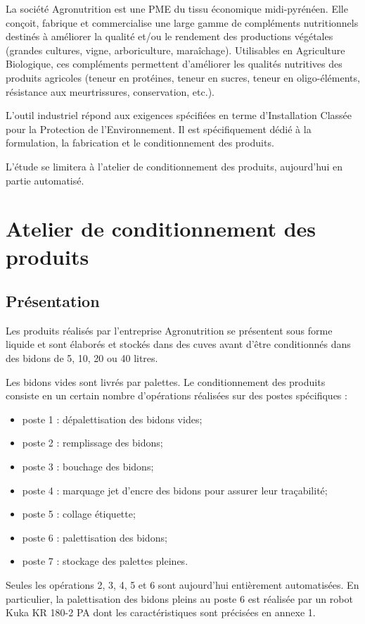 La société Agronutrition est une PME du tissu économique midi-pyrénéen. Elle conçoit, 
fabrique et commercialise une large gamme de compléments nutritionnels destinés à 
améliorer la qualité et/ou le rendement des productions végétales (grandes cultures, vigne, 
arboriculture, maraîchage). Utilisables en Agriculture Biologique, ces compléments 
permettent d'améliorer les qualités nutritives des produits agricoles (teneur en protéines, 
teneur en sucres, teneur en oligo-éléments, résistance aux meurtrissures, conservation, etc.). 

L’outil industriel répond aux exigences spécifiées en terme d’Installation Classée pour la 
Protection de l’Environnement. Il est spécifiquement dédié à la formulation, la fabrication et 
le conditionnement des produits. 

L’étude se limitera à l’atelier de conditionnement des produits, aujourd’hui en partie 
automatisé.

\section{Atelier de conditionnement des produits}

\subsection{Présentation }
Les produits réalisés par l’entreprise Agronutrition se présentent sous forme liquide et sont 
élaborés et stockés dans des cuves avant d’être conditionnés dans des bidons de 5, 10, 20 ou 
40 litres. 

Les bidons vides sont livrés par palettes. Le conditionnement des produits consiste en un 
certain nombre d’opérations réalisées sur des postes spécifiques : 
\begin{itemize}
\item poste 1 : dépalettisation des bidons vides;
\item poste 2 : remplissage des bidons;
\item poste 3 : bouchage des bidons;
\item poste 4 : marquage jet d’encre des bidons pour assurer leur traçabilité;
\item poste 5 : collage étiquette;
\item poste 6 : palettisation des bidons;
\item poste 7 : stockage des palettes pleines. 
\end{itemize}
Seules les opérations 2, 3, 4, 5 et 6 sont aujourd’hui entièrement automatisées. En particulier, 
la palettisation des bidons pleins au poste 6 est réalisée par un robot Kuka KR 180-2 PA dont 
les caractéristiques sont précisées en annexe 1.

